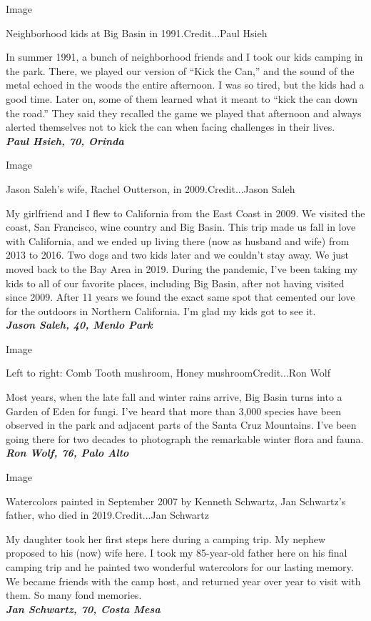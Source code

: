 Image

Neighborhood kids at Big Basin in 1991.Credit...Paul Hsieh

In summer 1991, a bunch of neighborhood friends and I took our kids
camping in the park. There, we played our version of ``Kick the Can,''
and the sound of the metal echoed in the woods the entire afternoon. I
was so tired, but the kids had a good time. Later on, some of them
learned what it meant to ``kick the can down the road.'' They said they
recalled the game we played that afternoon and always alerted themselves
not to kick the can when facing challenges in their lives.\\
\emph{\textbf{Paul Hsieh, 70, Orinda}}

Image

Jason Saleh's wife, Rachel Outterson, in 2009.Credit...Jason Saleh

My girlfriend and I flew to California from the East Coast in 2009. We
visited the coast, San Francisco, wine country and Big Basin. This trip
made us fall in love with California, and we ended up living there (now
as husband and wife) from 2013 to 2016. Two dogs and two kids later and
we couldn't stay away. We just moved back to the Bay Area in 2019.
During the pandemic, I've been taking my kids to all of our favorite
places, including Big Basin, after not having visited since 2009. After
11 years we found the exact same spot that cemented our love for the
outdoors in Northern California. I'm glad my kids got to see it.\\
\emph{\textbf{Jason Saleh, 40, Menlo Park}}

Image

Left to right: Comb Tooth mushroom, Honey mushroomCredit...Ron Wolf

Most years, when the late fall and winter rains arrive, Big Basin turns
into a Garden of Eden for fungi. I've heard that more than 3,000 species
have been observed in the park and adjacent parts of the Santa Cruz
Mountains. I've been going there for two decades to photograph the
remarkable winter flora and fauna.\\
\emph{\textbf{Ron Wolf, 76, Palo Alto}}

Image

Watercolors painted in September 2007 by Kenneth Schwartz, Jan
Schwartz's father, who died in 2019.Credit...Jan Schwartz

My daughter took her first steps here during a camping trip. My nephew
proposed to his (now) wife here. I took my 85-year-old father here on
his final camping trip and he painted two wonderful watercolors for our
lasting memory. We became friends with the camp host, and returned year
over year to visit with them. So many fond memories.\\
\emph{\textbf{Jan Schwartz, 70, Costa Mesa}}

